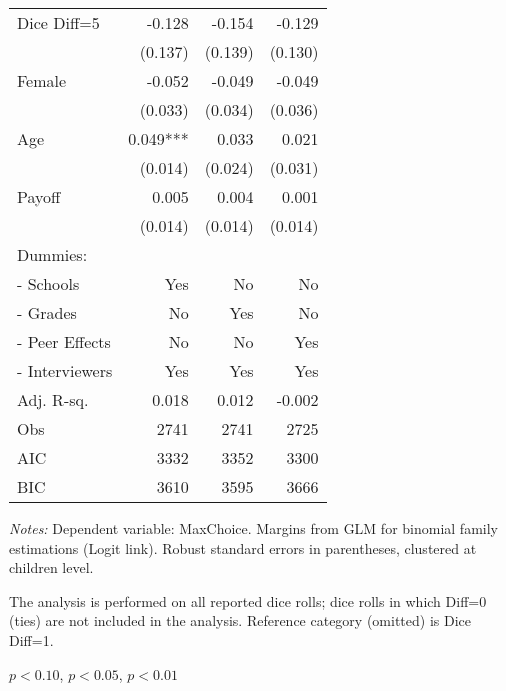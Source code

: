 \begin{table}[htbp]
\begin{threeparttable}
\begin{tabular}{l*{3}{D{.}{.}{-1}}}
Dice Diff=5         &              -0.128   &              -0.154   &              -0.129   \\
                    &             (0.137)   &             (0.139)   &             (0.130)   \\
Female              &              -0.052   &              -0.049   &              -0.049   \\
                    &             (0.033)   &             (0.034)   &             (0.036)   \\
Age                 &               0.049***&               0.033   &               0.021   \\
                    &             (0.014)   &             (0.024)   &             (0.031)   \\
Payoff              &               0.005   &               0.004   &               0.001   \\
                    &             (0.014)   &             (0.014)   &             (0.014)   \\ \midrule 
Dummies: &&& \\
- Schools      &                 Yes   &                  No   &                  No   \\
- Grades       &                  No   &                 Yes   &                  No   \\
- Peer Effects &                  No   &                  No   &                 Yes  \\
- Interviewers &                 Yes   &                 Yes   &                 Yes   \\
\midrule
Adj. R-sq.          &               0.018   &                0.012  &                 -0.002      \\
Obs                 &                2741   &                2741   &                2725   \\
AIC                 &                3332   &                3352   &                3300   \\
BIC                 &                3610   &                3595   &                3666   \\
\bottomrule
\end{tabular}
\begin{tablenotes}
\footnotesize
\textit{Notes:} Dependent variable: MaxChoice. Margins from GLM for binomial family estimations (Logit link). Robust standard errors in parentheses, clustered at children level. \\
\item The analysis is performed on all reported dice rolls; dice rolls in which Diff=0 (ties) are not included in the analysis. Reference category (omitted) is Dice Diff=1. \\
\item \sym{*} \(p<0.10\), \sym{**} \(p<0.05\), \sym{***} \(p<0.01\)
\end{tablenotes}
\end{threeparttable}
\label{tab:cheat_patterns}
\end{table}
